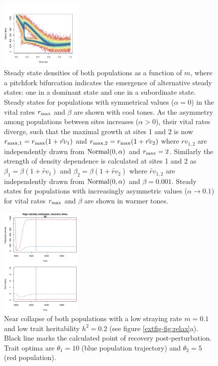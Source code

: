 \documentclass{revtex4}
\begin{document}
\begin{figure}
  \captionsetup{justification=raggedright,
singlelinecheck=false
}
\centering
\includegraphics[width=0.35\textwidth]{fig_asymdensity.pdf}
\caption{
Steady state densities of both populations as a function of $m$, where a pitchfork bifurcation indicates the emergence of alternative steady states: one in a dominant state and one in a subordinate state.
Steady states for populations with symmetrical values ($\alpha=0$) in the vital rates $r_{\rm max}$ and $\beta$ are shown with cool tones.
As the asymmetry among populations between sites increases ($\alpha>0$), their vital rates diverge, such that the maximal growth at sites 1 and 2 is now $r_{\rm max,1}=r_{\rm max}(1+\tilde{rv}_1)$ and $r_{\rm max,2}=r_{\rm max}(1+\tilde{rv}_2)$ where $rv_{1,2}$ are independently drawn from $\rm{Normal}(0,\alpha)$ and $r_{\rm max}=2$. 
Similarly the strength of density dependence is calculated at sites 1 and 2 as $\beta_1=\beta(1+\tilde{rv}_1)$ and $\beta_2=\beta(1+\tilde{rv}_2)$ where $\tilde{rv}_{1,2}$ are independently drawn from $\rm{Normal}(0,\alpha)$ and $\beta=0.001$.
Steady states for populations with increasingly asymmetric values ($\alpha\rightarrow 0.1$) for vital rates $r_{\rm max}$ and $\beta$ are shown in warmer tones.
} \label{fig:symmetry}
\end{figure}



\begin{figure}
  \captionsetup{justification=raggedright,
singlelinecheck=false
}
\centering
\includegraphics[width=0.35\textwidth]{fig_relax_both_lowh.pdf}
\caption{
Near collapse of both populations with a low straying rate $m=0.1$ and low trait heritability $h^2=0.2$ (see figure \ref{extfig-fig:relax}a).
Black line marks the calculated point of recovery post-perturbation.
Trait optima are $\theta_1 = 10$ (blue population trajectory) and $\theta_2 = 5$ (red population).
} \label{fig:relaxtraj_bothlh}
\end{figure}
\end{document}
